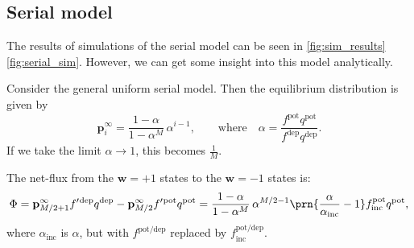 \documentclass[10pt]{article}
\newcommand{\pr}{\mathbf{p}}
\newcommand{\eq}{\pr^\infty}
\newcommand{\w}{\mathbf{w}}
\newcommand{\pot}{^{\text{pot}}}
\newcommand{\dep}{^{\text{dep}}}
\newcommand{\potdep}{^{\text{pot/dep}}}
\newcommand{\inc}{_{\text{inc}}}
\begin{document}
%
%
%






\subsection{Serial model}\label{sec:multistate}

%
%


The results of simulations of the serial model can be seen in
\autoref{fig:sim_results}\ref{fig:serial_sim}.
However, we can get some insight into this model analytically.



Consider the general uniform serial model.
Then the equilibrium distribution is given by
%
\begin{equation}\label{eq:mutltieq}
  \eq_i = \frac{1-\alpha}{1-\alpha^M}\,\alpha^{i-1},
  \qquad \text{where} \quad
  \alpha=\frac{f\pot q\pot}{f\dep q\dep}.
\end{equation}
%
If we take the limit $\alpha\rightarrow1$, this becomes $\frac{1}{M}$.

The net-flux from the $\w=+1$ states to the $\w=-1$ states is:
%
\begin{equation}\label{eq:multiflux}
  \Phi = \eq_{M/2+1}f'{}\dep q\dep - \eq_{M/2}f'{}\pot q\pot = \frac{1-\alpha}{1-\alpha^M} \, \alpha^{M/2-1} \prn{\frac{\alpha}{\alpha\inc} - 1} f\inc\pot  q\pot,
\end{equation}
%
where $\alpha\inc$ is $\alpha$, but with $f\potdep$ replaced by $f\potdep\inc$.
\end{document}
